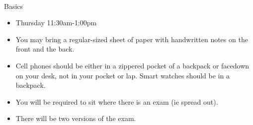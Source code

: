 \documentclass[11pt,fleqn]{article}
\begin{document}
\renewcommand{\headrulewidth}{0pt}
\newcommand{\blank}[1]{\rule{#1}{0.75pt}}
\newcommand{\bc}{\begin{center}}
\newcommand{\ec}{\end{center}}
\renewcommand{\d}{\displaystyle}

\vspace*{-0.7in}

\begin{center}
  \large
  \\
   
\end{center}
{\Large{Basics}}\\

\begin{itemize}
\item Thursday 11:30am-1:00pm
\item You may bring a regular-sized sheet of paper with handwritten notes on the front and the back.
\item Cell phones should be either in a zippered pocket of a backpack or facedown on your desk, not in your pocket or lap. Smart watches should be in a backpack.
\item You will be required to sit where there is an exam (ie spread out).
\item There will be two versions of the exam.\\
\end{itemize}

\\
\end{document}
